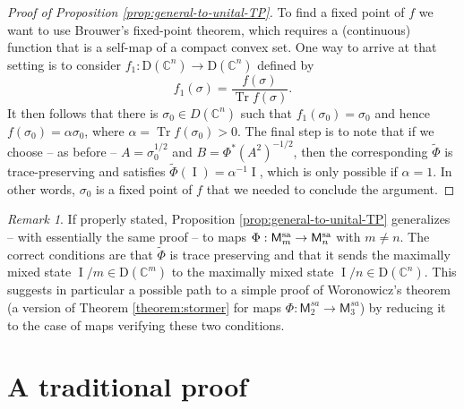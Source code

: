 \documentclass[10pt]{article}
\DeclareMathOperator{\tr}{Tr}
\DeclareMathOperator{\Id}{I}
\renewcommand{\geq}{\geqslant}
\newcommand{\cD}{\mathrm{D}}
\newcommand{\PSD}{\mathcal{PSD}}
\newcommand{\cP}{\bm{P}}
\newcommand{\C}{\mathbb{C}}
\newcommand{\cM}{\mathsf{M}}
\newcommand{\sa}{\textnormal{sa}}
\theoremstyle{plain}
\theoremstyle{definition}
\theoremstyle{remark}
\newtheorem{remark}[theorem]{Remark}
\begin{document}
\begin{proof} [Proof of Proposition \ref{prop:general-to-unital-TP}]
To find a fixed point of $f$ we want to use Brouwer's fixed-point theorem, which requires a 
(continuous) function 
that is a self-map of a compact convex set. One way to arrive at that setting is to consider 
$f_1 : \cD(\C^n) \to \cD(\C^n)$ defined by 
\begin{equation} \label{eq:general-to-unital-TP5}
f_1(\sigma) = \frac{f(\sigma)}{\tr f(\sigma)} . 
\end{equation} 
It then follows that there is $\sigma_0 \in D(\C^n)$ such that $f_1(\sigma_0) = \sigma_0$ 
and hence $f(\sigma_0) = \alpha \sigma_0$, where $\alpha = \tr f(\sigma_0)>0$. 
The final step is to note that  if we choose -- as before -- 
$A= \sigma_0^{1/2}$ and $B = \Phi^*(A^2)^{-1/2}$, then the corresponding 
$\tilde{\Phi}$ is trace-preserving and satisfies $\tilde{\Phi} (\Id) = \alpha ^{-1} \Id$, 
which is only possible if $\alpha =1$. In other words, $\sigma_0$ is a fixed point of $f$ 
that we needed to conclude the argument.  
%
\end{proof}
\begin{remark} If properly stated, Proposition \ref{prop:general-to-unital-TP} generalizes -- 
with essentially the same proof -- to maps $\Phi : \cM_m^{\sa} \to \cM_n^{\sa}$ with $m\neq n$. 
The correct conditions are that $\tilde{\Phi}$ is trace preserving and that it sends  the maximally mixed state 
$\Id/m \in \cD(\C^m)$ to the maximally mixed state 
$\Id/n \in \cD(\C^n)$. 
This suggests in particular a possible path to a simple proof of Woronowicz's theorem \cite{Woronowicz76} 
(a version of Theorem \ref{theorem:stormer} for maps $\Phi : \cM_2^{sa} \to \cM_3^{sa}$) 
by reducing it to the case of maps verifying these two conditions. 

\end{remark}

\section{A traditional proof} 
\end{document}
